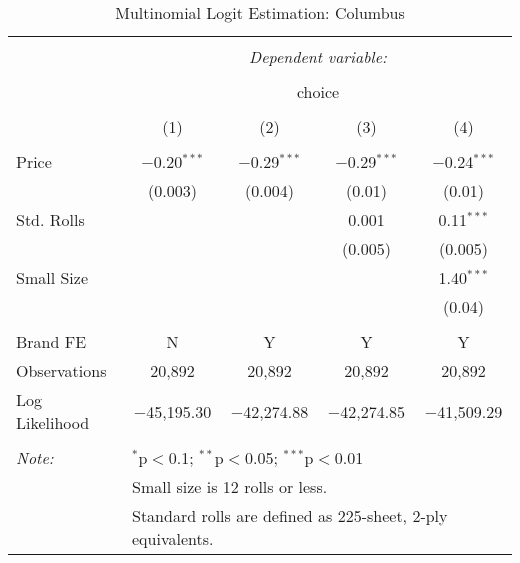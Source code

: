 
\begin{table}[!htbp] \centering 
  \caption{Multinomial Logit Estimation: Columbus} 
  \label{tab:mnlColumbusBaseline} 
\begin{tabular}{@{\extracolsep{5pt}}lcccc} 
\\[-1.8ex]\hline 
\hline \\[-1.8ex] 
 & \multicolumn{4}{c}{\textit{Dependent variable:}} \\ 
\cline{2-5} 
\\[-1.8ex] & \multicolumn{4}{c}{choice} \\ 
\\[-1.8ex] & (1) & (2) & (3) & (4)\\ 
\hline \\[-1.8ex] 
 Price & $-$0.20$^{***}$ & $-$0.29$^{***}$ & $-$0.29$^{***}$ & $-$0.24$^{***}$ \\ 
  & (0.003) & (0.004) & (0.01) & (0.01) \\ 
  Std. Rolls &  &  & 0.001 & 0.11$^{***}$ \\ 
  &  &  & (0.005) & (0.005) \\ 
  Small Size &  &  &  & 1.40$^{***}$ \\ 
  &  &  &  & (0.04) \\ 
 \hline \\[-1.8ex] 
Brand FE & N & Y & Y & Y \\ 
Observations & 20,892 & 20,892 & 20,892 & 20,892 \\ 
Log Likelihood & $-$45,195.30 & $-$42,274.88 & $-$42,274.85 & $-$41,509.29 \\ 
\hline 
\hline \\[-1.8ex] 
\textit{Note:}  & \multicolumn{4}{l}{$^{*}$p$<$0.1; $^{**}$p$<$0.05; $^{***}$p$<$0.01} \\ 
 & \multicolumn{4}{l}{Small size is 12 rolls or less.} \\ 
 & \multicolumn{4}{l}{Standard rolls are defined as 225-sheet, 2-ply equivalents.} \\ 
\end{tabular} 
\end{table} 
